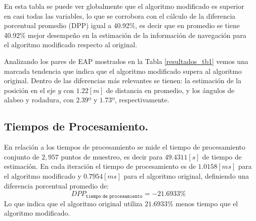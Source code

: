 \documentclass[conference]{IEEEtran}
\begin{document}
En esta tabla se puede ver globalmente que el algoritmo modificado es superior en casi todas las variables, lo que se corrobora con el cálculo de la diferencia porcentual promedio (DPP) igual a 40.92\%, es decir que en promedio se tiene 40.92\% mejor desempeño en la estimación de la información de navegación para el algoritmo modificado respecto al original.\par
Analizando los pares de EAP mostrados en la Tabla \ref{resultados_tb1} vemos una marcada tendencia que indica que el algoritmo modificado supera al algoritmo original. Dentro de las diferencias más relevantes se tienen: la estimación de la posición en el eje $y$ con $1.22[m]$ de distancia en promedio, y los ángulos de alabeo y rodadura, con $2.39º$ y $1.73º$, respectivamente.
\subsection{Tiempos de Procesamiento.}
En relación a los tiempos de procesamiento se mide el tiempo de procesamiento conjunto de $2,957$ puntos de muestreo, es decir para $49.4311 [s]$ de tiempo de estimación. En cada iteración el tiempo de procesamiento es de $1.0158[ms]$ para el algoritmo modificado y $0.7954 [ms]$ para el algoritmo original, definiendo una diferencia porcentual promedio de:
\begin{equation}
DPP_{\texttt{tiempo de procesamiento}}=-21.6933\%
\end{equation}
Lo que indica que el algoritmo original utiliza $21.6933\%$ menos tiempo que el algoritmo modificado.
\end{document}
